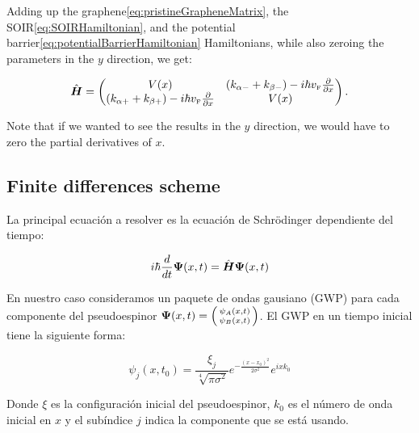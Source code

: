     Adding up the graphene\eqref{eq:pristineGrapheneMatrix}, the SOIR\eqref{eq:SOIRHamiltonian}, and the potential barrier\eqref{eq:potentialBarrierHamiltonian} Hamiltonians, while also zeroing the parameters in the $y$ direction, we get:

    \begin{equation}
        \label{eq:hybridHamiltonian}
        \hat{\mbox{\boldmath $H$}}=
        \begin{pmatrix}
            V(x) & \left(k_{\alpha-}+k_{\beta-}\right)-i\hbar v_{\mbox{\tiny F}}\frac{\partial}{\partial x}\\
            \left(k_{\alpha+}+k_{\beta+}\right)-i\hbar v_{\mbox{\tiny F}}\frac{\partial}{\partial x} & V(x)
        \end{pmatrix}.
    \end{equation}

    Note that if we wanted to see the results in the $y$ direction, we would have to zero the partial derivatives of $x$.

    \subsection{Finite differences scheme}\label{subsec:finite-differences-scheme}

    La principal ecuación a resolver es la ecuación de Schrödinger dependiente del tiempo:

    \begin{equation}
        \label{eq:schrodingerTimeDependent}
        i\hbar \frac{d}{dt}\mbox{\boldmath $\Psi$}(x,t) = \hat{\mbox{\boldmath $H$}}\mbox{\boldmath $\Psi$}(x,t)
    \end{equation}

    En nuestro caso consideramos un paquete de ondas gausiano (GWP) para cada componente del pseudoespinor $\bn{\Psi}(x,t)=\begin{psmallmatrix*}\psi_A(x,t)\\\psi_B(x,t)\end{psmallmatrix*}$.
    El GWP en un tiempo inicial tiene la siguiente forma:

    \begin{equation}
        \label{eq:GWP}
        \psi_j(x,t_0)=\frac{\xi_j}{\sqrt[4]{\pi\sigma^2}}e^{-\frac{(x-x_0)^2}{2\sigma^2}}e^{ixk_0}
    \end{equation}

    \noindent Donde $\xi$ es la configuración inicial del pseudoespinor, $k_0$ es el número de onda inicial en $x$ y el subíndice $j$ indica la componente que se está usando.

